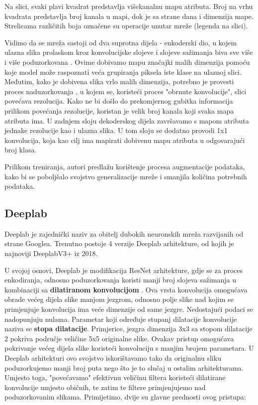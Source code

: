 \noindent Na slici, svaki plavi kvadrat predstavlja višekanalnu mapu atributa. Broj na vrhu kvadrata predstavlja broj kanala u mapi, dok je sa strane dana i dimenzija mape. Strelicama različitih boja označene su operacije unutar mreže (legenda na slici).

Vidimo da se mreža sastoji od dva suprotna dijela - enkoderski dio, u kojem ulazna slika prolaskom kroz konvolucijske slojeve i slojeve sažimanja biva sve više i više poduzorkovana . Ovime dobivamo mapu značajki malih dimenzija pomoću koje model može raspoznati veća grupiranja piksela iste klase na ulaznoj slici. Međutim, kako je dobivena slika vrlo malih dimenzija, potrebno je provesti proces naduzorkovanja , u kojem se, koristeći proces "obrnute konvolucije", slici povećava rezolucija. Kako ne bi došlo do prekomjernog gubitka informacija prilikom povećanja rezolucije, koristan je velik broj kanala koji svaka mapa atributa ima. U zadnjem sloju dekoderskog dijela završavamo s mapom atributa jednake rezolucije kao i ulazna slika. U tom sloju se dodatno provodi 1x1 konvolucija, koja kao cilj ima mapirati dobivenu mapu atributa u odgovarajući broj klasa.

Prilikom treniranja, autori predlažu korištenje procesa augmentacije podataka, kako bi se poboljšalo svojstvo generalizacije mreže i smanjila količina potrebnih podataka.


\subsection{Deeplab}
Deeplab je zajednički naziv za obitelj dubokih neuronskih mreža razvijanih od strane Googlea. Trenutno postoje 4 verzije Deeplab arhitekture, od kojih je najnoviji DeeplabV3+ iz 2018.

U svojoj osnovi, Deeplab je modifikacija ResNet arhitekture, gdje se za proces enkodiranja, odnosno poduzorkovanja koristi manji broj slojeva sažimanja u kombinaciji sa \textbf{ dilatiranom konvolucijom} . Ova vrsta konvolucija omogućava obrade većeg dijela slike manjom jezgrom, odnosno polje slike nad kojim se primjenjuje konvolucija ima veće dimenzije od same jezgre. Nedostajući podaci se nadopunjuju nulama. Parametar koji određuje stupanj dilatacije konvolucije naziva se \textbf{stopa dilatacije}. Primjerice, jezgra dimenzija 3x3 sa stopom dilatacije 2 pokriva područje veličine 5x5 originalne slike. Ovakav pristup omogućava pokrivanje većeg dijela slike koristeći konvoluciju s manjim brojem parametara. U Deeplab arhitekturi ovo svojstvo iskorištavamo tako da originalnu sliku poduzorkujemo manji broj puta nego što je to slučaj u ostalim arhitekturama. Umjesto toga, "povećavamo" efektivnu veličinu filtera koristeći dilatirane konvolucije umjesto običnih, te zatim te filtere primjenjujemo nad poduzorkovanim slikama. Primijetimo, dvije su glavne prednosti ovog pristupa: \citep{towardsDeeplab}

